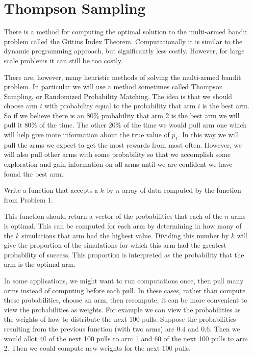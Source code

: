 \section*{Thompson Sampling}
There is a method for computing the optimal solution to the multi-armed bandit problem called the Gittins Index Theorem.  Computationally it is similar to the dynamic programming approach, but significantly less costly.  However, for large scale problems it can still be too costly.

There are, however, many heuristic methods of solving the multi-armed bandit problem.  In particular we will use a method sometimes called Thompson Sampling, or Randomized Probability Matching.  The idea is that we should choose arm $i$ with probability equal to the probability that arm $i$ is the best arm.  So if we believe there is an $80\%$ probability that arm 2 is the best arm we will pull it $80\%$ of the time.  The other $20\%$ of the time we would pull arm one which will help give more information about the true value of $p_1$.  In this way we will pull the arms we expect to get the most rewards from most often.  However, we will also pull other arms with some probability so that we accomplish some exploration and gain information on all arms until we are confident we have found the best arm.

\begin{problem}
Write a function that accepts a $k$ by $n$ array of data computed by the function from Problem 1.  

This function should return a vector of the probabilities that each of the $n$ arms is optimal.  This can be computed for each arm by determining in how many of the $k$ simulations that arm had the highest value.  Dividing this number by $k$ will give the proportion of the simulations for which this arm had the greatest probability of success.  This proportion is interpreted as the probability that the arm is the optimal arm.
\end{problem}

In some applications, we might want to run computations once, then pull many arms instead of computing before each pull.  In these cases, rather than compute these probabilities, choose an arm, then recompute, it can be more convenient to view the probabilities as weights.  For example we can view the probabilities as the weights of how to distribute the next 100 pulls.  Suppose the probabilities resulting from the previous function (with two arms) are $0.4$ and $0.6$.  Then we would allot 40 of the next 100 pulls to arm 1 and 60 of the next 100 pulls to arm 2.  Then we could compute new weights for the next 100 pulls.


